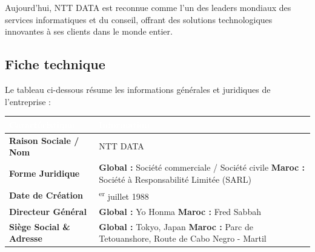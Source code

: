 \documentclass[12pt, a4paper, openany]{report}
\begin{document}
\vspace{-0.4cm}
Aujourd'hui, NTT DATA est reconnue comme l'un des leaders mondiaux des services informatiques et du conseil, offrant des solutions technologiques innovantes à ses clients dans le monde entier.

\vspace{-0.4cm}
\subsection{Fiche technique}
\vspace{-0.3cm}
Le tableau ci-dessous résume les informations générales et juridiques de l'entreprise :

\vspace{-0.2cm}
\begin{table}[H]
    \centering
    \renewcommand{\arraystretch}{1.6} 
    \setlength{\arrayrulewidth}{1pt}
    
    \begin{tabular}{|>{\centering\arraybackslash}p{}|>{\raggedright\arraybackslash}p{}|}
        \hline
        \rowcolor{primaryBlue}
        \textbf{\textcolor{white}{Caractéristique}} & \textbf{\textcolor{white}{Information}} \\
        \hline
        
        \rowcolor{lightBlue}
        \textbf{Raison Sociale / Nom} & NTT DATA \\
        \hline
        
        \textbf{Forme Juridique} & 
        \textbf{Global :} Société commerciale / Société civile \newline 
        \textbf{Maroc :} Société à Responsabilité Limitée (SARL) \\
        \hline
        
        \rowcolor{lightBlue}
        \textbf{Date de Création} & 1\textsuperscript{er} juillet 1988 \\
        \hline
        
        \textbf{Directeur Général} & 
        \textbf{Global :} Yo Honma \newline 
        \textbf{Maroc :} Fred Sabbah \\
        \hline
        
        \rowcolor{lightBlue}
        \textbf{Siège Social \& Adresse} & 
        \textbf{Global :} Tokyo, Japan \newline 
        \textbf{Maroc :} Parc de Tetouanshore, Route de Cabo Negro - Martil \\
        \hline
        

\end{tabular}
\end{table}
\end{document}
